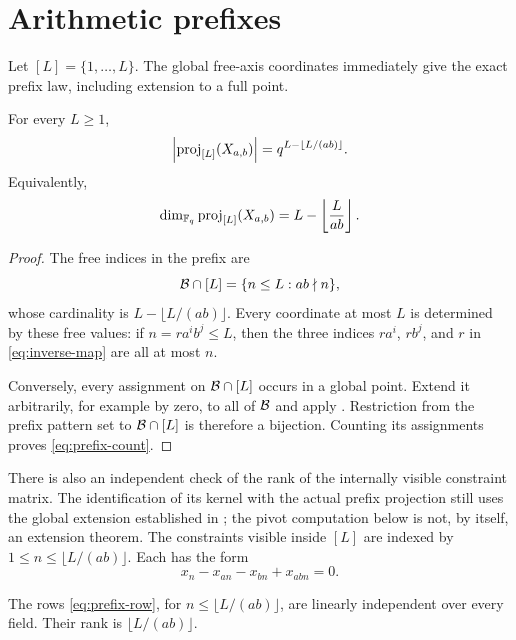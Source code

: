 \section{Arithmetic prefixes}\label{sec:prefixes}

Let $[L]=\{1,\ldots,L\}$.  The global free-axis coordinates immediately
give the exact prefix law, including extension to a full point.

\begin{proposition}\label{prop:prefix-count}
For every $L\geq1$,
\begin{equation}\label{eq:prefix-count}
 \left|\operatorname{proj}_{[L]}(X_{a,b})\right|
 =q^{L-\lfloor L/(ab)\rfloor}.
\end{equation}
Equivalently,
\begin{equation}\label{eq:prefix-dimension}
 \dim_{\mathbb F_q}\operatorname{proj}_{[L]}(X_{a,b})
 =L-\left\lfloor\frac{L}{ab}\right\rfloor.
\end{equation}
\end{proposition}

\begin{proof}
The free indices in the prefix are
\[
 \mathcal B\cap[L]=\{n\leq L:ab\nmid n\},
\]
whose cardinality is $L-\lfloor L/(ab)\rfloor$.  Every coordinate at most
$L$ is determined by these free values: if $n=r a^i b^j\leq L$, then the
three indices $r a^i$, $r b^j$, and $r$ in
\eqref{eq:inverse-map} are all at most $n$.

Conversely, every assignment on $\mathcal B\cap[L]$ occurs in a global point.  Extend
it arbitrarily, for example by zero, to all of $\mathcal B$ and apply
.  Restriction from the prefix pattern set to
$\mathcal B\cap[L]$ is therefore a bijection.  Counting its assignments proves
\eqref{eq:prefix-count}.
\end{proof}

There is also an independent check of the rank of the internally visible
constraint matrix.  The identification of its kernel with the actual prefix
projection still uses the global extension established in
; the pivot computation below is not, by itself, an
extension theorem.  The constraints visible inside $[L]$ are indexed by
$1\leq n\leq\lfloor L/(ab)\rfloor$.  Each has the form
\begin{equation}\label{eq:prefix-row}
 x_n-x_{an}-x_{bn}+x_{abn}=0.
\end{equation}

\begin{lemma}\label{lem:prefix-pivots}
The rows \eqref{eq:prefix-row}, for
$n\leq\lfloor L/(ab)\rfloor$, are linearly independent over every field.
Their rank is $\lfloor L/(ab)\rfloor$.
\end{lemma}

